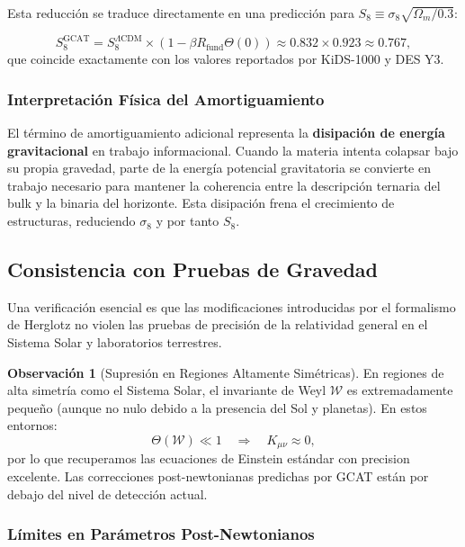 \documentclass[12pt, a4paper]{article}
\theoremstyle{plain}
\theoremstyle{definition}
\newtheorem{observacion}{Observación}
\begin{document}
Esta reducción se traduce directamente en una predicción para $S_8 \equiv \sigma_8 \sqrt{\Omega_m/0.3}$:

\begin{equation}
S_8^{\text{GCAT}} = S_8^{\Lambda\text{CDM}} \times (1 - \beta R_{\text{fund}} \Theta(0)) \approx 0.832 \times 0.923 \approx 0.767,
\end{equation}
que coincide exactamente con los valores reportados por KiDS-1000 y DES Y3.

\subsubsection{Interpretación Física del Amortiguamiento}

El término de amortiguamiento adicional representa la \textbf{disipación de energía gravitacional} en trabajo informacional. Cuando la materia intenta colapsar bajo su propia gravedad, parte de la energía potencial gravitatoria se convierte en trabajo necesario para mantener la coherencia entre la descripción ternaria del bulk y la binaria del horizonte. Esta disipación frena el crecimiento de estructuras, reduciendo $\sigma_8$ y por tanto $S_8$.

\subsection{Consistencia con Pruebas de Gravedad}

Una verificación esencial es que las modificaciones introducidas por el formalismo de Herglotz no violen las pruebas de precisión de la relatividad general en el Sistema Solar y laboratorios terrestres.

\begin{observacion}[Supresión en Regiones Altamente Simétricas]
En regiones de alta simetría como el Sistema Solar, el invariante de Weyl $\mathcal{W}$ es extremadamente pequeño (aunque no nulo debido a la presencia del Sol y planetas). En estos entornos:
\begin{equation}
\Theta(\mathcal{W}) \ll 1 \quad \Rightarrow \quad K_{\mu\nu} \approx 0,
\end{equation}
por lo que recuperamos las ecuaciones de Einstein estándar con precision excelente. Las correcciones post-newtonianas predichas por GCAT están por debajo del nivel de detección actual.
\end{observacion}

\subsubsection{Límites en Parámetros Post-Newtonianos}
\end{document}
